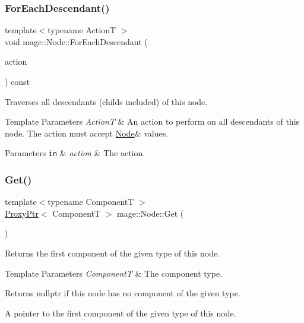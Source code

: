 \subsubsection{\texorpdfstring{For\+Each\+Descendant()}{ForEachDescendant()}}
{\footnotesize\ttfamily template$<$typename ActionT $>$ \\
void mage\+::\+Node\+::\+For\+Each\+Descendant (\begin{DoxyParamCaption}\item[{ActionT \&\&}]{action }\end{DoxyParamCaption}) const}

Traverses all descendants (childs included) of this node.


\begin{DoxyTemplParams}{Template Parameters}
{\em ActionT} & An action to perform on all descendants of this node. The action must accept {\ttfamily \mbox{\hyperlink{classmage_1_1_node}{Node}}\&} values. \\
\hline
\end{DoxyTemplParams}

\begin{DoxyParams}[1]{Parameters}
\mbox{\tt in}  & {\em action} & The action. \\
\hline
\end{DoxyParams}
\mbox{\label{classmage_1_1_node_af514b0282820f1d071fc24a2b815ae82}} 
\subsubsection{\texorpdfstring{Get()}{Get()}\hspace{0.1cm}{\footnotesize\ttfamily [1/3]}}
{\footnotesize\ttfamily template$<$typename ComponentT $>$ \\
\mbox{\hyperlink{classmage_1_1_proxy_ptr}{Proxy\+Ptr}}$<$ ComponentT $>$ mage\+::\+Node\+::\+Get (\begin{DoxyParamCaption}{ }\end{DoxyParamCaption})\hspace{0.3cm}{\ttfamily [noexcept]}}

Returns the first component of the given type of this node.


\begin{DoxyTemplParams}{Template Parameters}
{\em ComponentT} & The component type. \\
\hline
\end{DoxyTemplParams}
\begin{DoxyReturn}{Returns}
{\ttfamily nullptr} if this node has no component of the given type. 

A pointer to the first component of the given type of this node. 
\end{DoxyReturn}
\mbox{\label{classmage_1_1_node_a597f86bd9faecda719c37c4b2c73231e}} 
